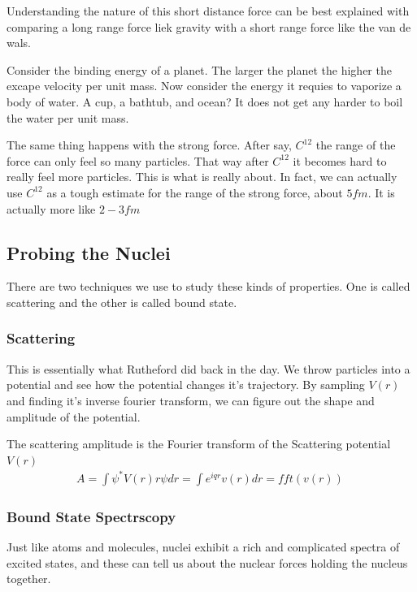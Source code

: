\documentclass[english, 11pt]{article}
\begin{document}
        Understanding the nature of this short distance force can be best explained with comparing a long range force liek gravity with a short range force like the van de wals. 

        Consider the binding energy of a planet. The larger the planet the higher the excape velocity per unit mass. Now consider the energy it requies to vaporize a body of water. A cup, a bathtub, and ocean? It does not get any harder to boil the water per unit mass. 

        The same thing happens with the strong force. After say, $C^{12}$ the range of the force can only feel so many particles. That way after $C^{12}$ it becomes hard to really feel more particles. This is what  is really about. In fact, we can actually use $C^{12}$ as a tough estimate for the range of the strong force, about $5fm$. It is actually more like $2-3 fm$
  
      \subsection{Probing the Nuclei}

        There are two techniques we use to study these kinds of properties. One is called scattering and the other is called bound state.

      \subsubsection*{Scattering}

        This is essentially what Rutheford did back in the day. We throw particles into a potential and see how the potential changes it's trajectory. By sampling $V(r)$ and finding it's inverse fourier transform, we can figure out the shape and amplitude of the potential.

      \begin{defn}
      The scattering amplitude is the Fourier transform of the Scattering potential $V(r)$
        \begin{align*}
          A = \int \psi^{*}V(r)r\psi dr = \int e^{iqr}v(r)dr = fft(v(r))\
        \end{align*}
      \end{defn}

      \subsubsection{Bound State Spectrscopy}
      Just like atoms and molecules, nuclei exhibit a rich and complicated spectra of excited states, and these can tell us about the nuclear forces holding the nucleus together.
\end{document}

